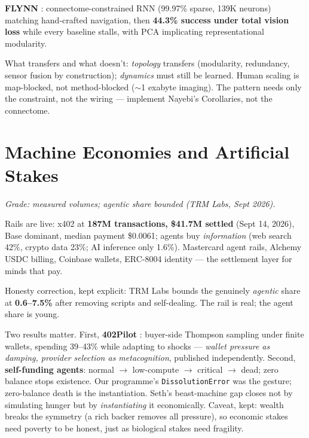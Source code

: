 \documentclass[11pt]{article}
\begin{document}
\textbf{FLYNN} \citep{flynn2026}: connectome-constrained RNN (99.97\% sparse, 139K neurons) matching hand-crafted navigation, then \textbf{44.3\% success under total vision loss} while every baseline stalls, with PCA implicating representational modularity.

What transfers and what doesn't: \emph{topology} transfers (modularity, redundancy, sensor fusion by construction); \emph{dynamics} must still be learned. Human scaling is map-blocked, not method-blocked ($\sim$1 exabyte imaging). The pattern needs only the constraint, not the wiring --- implement Nayebi's Corollaries, not the connectome.

\section{Machine Economies and Artificial Stakes}
\label{sec:agents}

\textit{Grade: measured volumes; agentic share bounded (TRM Labs, Sept 2026).}

Rails are live: x402 at \textbf{187M transactions, \$41.7M settled} (Sept 14, 2026), Base dominant, median payment \$0.0061; agents buy \emph{information} (web search 42\%, crypto data 23\%; AI inference only 1.6\%). Mastercard agent rails, Alchemy USDC billing, Coinbase wallets, ERC-8004 identity --- the settlement layer for minds that pay.

Honesty correction, kept explicit: TRM Labs \citep{trm2026} bounds the genuinely \emph{agentic} share at \textbf{0.6--7.5\%} after removing scripts and self-dealing. The rail is real; the agent share is young.

Two results matter. First, \textbf{402Pilot} \citep{402pilot2026}: buyer-side Thompson sampling under finite wallets, spending 39--43\% while adapting to shocks --- \emph{wallet pressure as damping, provider selection as metacognition}, published independently. Second, \textbf{self-funding agents}: normal $\to$ low-compute $\to$ critical $\to$ dead; zero balance stops existence. Our programme's \texttt{DissolutionError} was the gesture; zero-balance death is the instantiation. Seth's beast-machine gap closes not by simulating hunger but by \emph{instantiating} it economically. Caveat, kept: wealth breaks the symmetry (a rich backer removes all pressure), so economic stakes need poverty to be honest, just as biological stakes need fragility.
\end{document}
